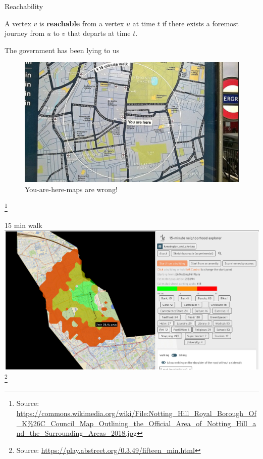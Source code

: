 \documentclass{beamer}
\newcommand{\sourcefootnote}[1]{\let\thefootnote\relax\footnote{{\tiny Source: \url{#1}}}}
\begin{document}
\begin{frame}{Reachability}
	\begin{tcolorbox}[title=Definition: Reachability]
    A vertex $v$ is \textbf{reachable} from a vertex $u$ at time $t$ if there exists a foremost journey from $u$ to $v$ that departs at time $t$.
	\end{tcolorbox}
\end{frame}



\begin{frame}{The government has been lying to us}
	\begin{figure}
		\includegraphics[width=0.9\linewidth]{media/image_1737738340.png}
		\caption{You-are-here-maps are wrong!}
	\end{figure}
	\sourcefootnote{https://commons.wikimedia.org/wiki/File:Notting_Hill_Royal_Borough_Of_K\%26C_Council_Map_Outlining_the_Official_Area_of_Notting_Hill_and_the_Surrounding_Areas_2018.jpg}
\end{frame}

\begin{frame}{15 min walk}
	\includegraphics[width=\linewidth]{media/15-min-walk.png}
	\sourcefootnote{https://play.abstreet.org/0.3.49/fifteen_min.html}
\end{frame}
\end{document}
